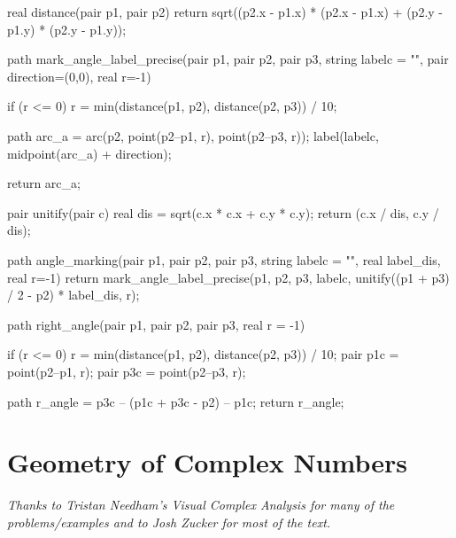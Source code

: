 \documentclass[../textbook.tex]{subfiles}
\begin{document}

\begin{asydef}
	
	
	real distance(pair p1, pair p2) {
		return sqrt((p2.x - p1.x) * (p2.x - p1.x) + (p2.y - p1.y) * (p2.y - p1.y));
	}
	
	path mark_angle_label_precise(pair p1, pair p2, pair p3, string labelc = "", pair direction=(0,0), real r=-1) {
		if (r <= 0) {
			r = min(distance(p1, p2), distance(p2, p3)) / 10;
		}
		
		path arc_a = arc(p2, point(p2--p1, r), point(p2--p3, r));
		label(labelc, midpoint(arc_a) + direction);
		
		return arc_a;
	}
	
	pair unitify(pair c) {
		real dis = sqrt(c.x * c.x + c.y * c.y);
		return (c.x / dis, c.y / dis);
	}
	
	path angle_marking(pair p1, pair p2, pair p3, string labelc = "", real label_dis, real r=-1) {
		return mark_angle_label_precise(p1, p2, p3, labelc, unitify((p1 + p3) / 2 - p2) * label_dis, r);
	}
	
	path right_angle(pair p1, pair p2, pair p3, real r = -1) {
		if (r <= 0) {
			r = min(distance(p1, p2), distance(p2, p3)) / 10;
		}
		pair p1c = point(p2--p1, r);
		pair p3c = point(p2--p3, r);
		
		path r_angle = p3c -- (p1c + p3c - p2) -- p1c;
		return r_angle;
	}
	
\end{asydef}

\section{Geometry of Complex Numbers}

\noindent\textit{Thanks to Tristan Needham's \emph{Visual Complex Analysis} for many of the problems/examples and to Josh Zucker for most of the text.}
\end{document}
